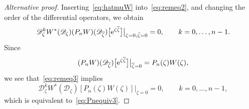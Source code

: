 \documentclass[10pt,a4paper]{article}
\numberwithin{equation}{section}
\begin{document}
\begin{proof}[Alternative proof]
 Inserting~\eqref{eq:hatmuW} into~\eqref{eq:remeq2}, and changing the order of the differential operators, we obtain
 \begin{equation}
 \label{eq:remeq3}
 \mathscr{D}_{\zeta}^k W^*(\mathscr{D}_\zeta) (P_n W)(\mathscr{D}_{\overline{\zeta}}) \big[{\rm e}^{\zeta \overline{\zeta}}\big] \big|_{\zeta=0, \bar{\zeta} =0}= 0, \qquad k=0,\dots,n-1.
 \end{equation}
 Since
 \begin{equation*}
 (P_n W)(\mathscr{D}_{\overline{\zeta}}) \big[{\rm e}^{\zeta \overline{\zeta}} \big]	\big|_{\overline{\zeta}=0} = P_n(\zeta) W(\zeta),
 \end{equation*}
 we see that~\eqref{eq:remeq3} implies
 \begin{equation*}
 \mathscr{D}_{\zeta}^k W^*(\mathscr{D}_\zeta) [P_n(\zeta)W(\zeta)] \big|_{\zeta=0} = 0,\qquad k=0,\dots,n-1,
 \end{equation*}
 which is equivalent to~\eqref{eq:Pnequiv3}.
 \end{proof}
\end{document}

